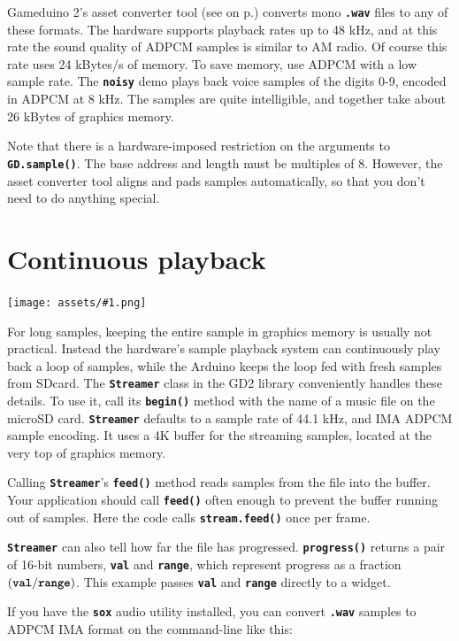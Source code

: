 \documentclass[10pt]{book}
\makeatletter
\newcommand{\gdtwos}{Gameduino 2's }
\newcommand{\png}[1]{
\begin{center}
\texttt{[image: assets/\#1.png]}
\end{center}
}
\newcommand{\mach}[1]{\texttt{\textbf{#1}}}
\newcommand{\cmdidx}[1]{
\index{#1@\mach{#1()}}
}
\newcommand{\cmd}[1]{\cmdidx{cmd\_#1}\nameref{cmd:#1}}
\newcommand{\xref}[1]{\textit{\nameref{#1}} on  p.\pageref{#1}}
\makeatother
\begin{document}
\gdtwos asset converter tool (see \xref{assets}) converts mono \mach{.wav}
files to any of these formats.
The hardware supports playback rates up to 48 kHz, and at this rate
the sound quality of ADPCM samples is similar to AM radio.
Of course this rate uses 24 kBytes/s of memory.
To save memory, use ADPCM with a low sample rate. The \mach{noisy} demo
plays back voice samples of the digits 0-9, encoded in ADPCM at 8 kHz.
The samples are quite intelligible, and together take about 26 kBytes of
graphics memory.

Note that there is a hardware-imposed restriction on the arguments to \mach{GD.sample()}.
The base address and length must be multiples of 8.
However, the asset converter tool aligns and pads samples automatically,
so that you don't need to do anything special.

\newpage
{}

\newpage
\section{Continuous playback}

\png{song}

For long samples, keeping the entire sample in graphics memory is usually not practical.
Instead the hardware's sample playback system can continuously play back a loop of samples, while the Arduino keeps the loop fed with
fresh samples from SDcard.
The \mach{Streamer} class in the GD2 library conveniently handles these details.
To use it, call its \mach{begin()} method with the name of a music file on the microSD card.
\mach{Streamer} defaults to a sample rate of 44.1 kHz, and IMA ADPCM sample encoding.
It uses a 4K buffer for the streaming samples, located at the very top of graphics memory.

Calling \mach{Streamer}'s \mach{feed()} method reads samples from the file into the buffer.
Your application should call \mach{feed()} often enough to prevent the buffer running out of samples.
Here the code calls \mach{stream.feed()} once per frame.

\mach{Streamer} can also tell how far the file has progressed.
\mach{progress()} returns a pair of 16-bit numbers,
\mach{val} and \mach{range}, which represent progress as a fraction $(\mach{val} / \mach{range})$.
This example passes \mach{val} and \mach{range} directly to a \cmd{slider} widget.

If you have the \mach{sox} audio utility installed, you can convert \mach{.wav} samples to ADPCM IMA format on the command-line like this:
\end{document}
